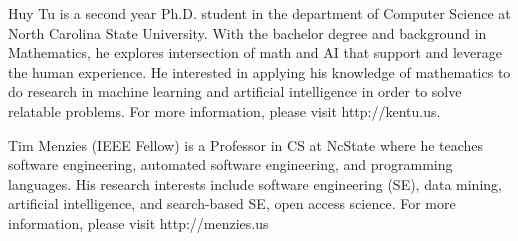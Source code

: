 \documentclass[10pt,journal,compsoc]{IEEEtran}
\begin{document}
\begin{IEEEbiography}{Huy Tu}  is a second year Ph.D. student in the department of Computer Science at North Carolina State University. With the bachelor degree and background in Mathematics, he explores  intersection of math and AI that support and leverage the human experience. He interested in applying his knowledge of mathematics to do research in machine learning and artificial intelligence in order to solve relatable problems. For more information,  please visit http://kentu.us.
\end{IEEEbiography}

  
 
\begin{IEEEbiography}{Tim Menzies} (IEEE Fellow)
is a Professor in CS at NcState 
where he teaches software engineering,
automated software engineering,
and programming languages.
His research interests include software engineering (SE), data mining, artificial intelligence, and search-based SE, open access science. 
For more information,  please visit http://menzies.us
\end{IEEEbiography}

 \newpage
\end{document}
